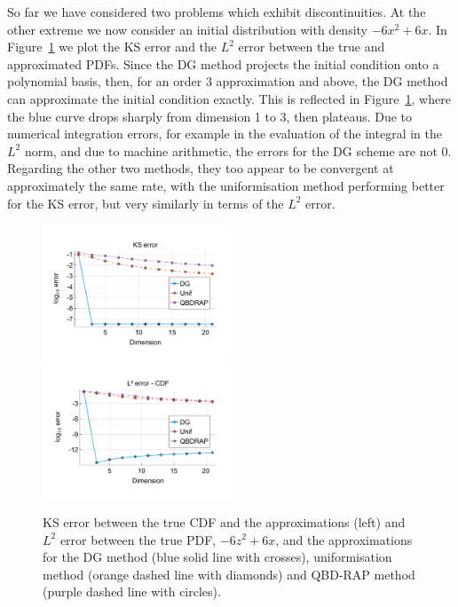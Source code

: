 \begin{example}So far we have considered two problems which exhibit discontinuities. At the other extreme we now consider an initial distribution with density \(-6x^2+6x\). In Figure~\ref{fig: fun 6 comp} we plot the KS error and the \(L^2\) error between the true and approximated PDFs. Since the DG method projects the initial condition onto a polynomial basis, then, for an order 3 approximation and above, the DG method can approximate the initial condition exactly. This is reflected in Figure~\ref{fig: fun 6 comp}, where the blue curve drops sharply from dimension 1 to 3, then plateaus. Due to numerical integration errors, for example in the evaluation of the integral in the \(L^2\) norm, and due to machine arithmetic, the errors for the DG scheme are not 0. Regarding the other two methods, they too appear to be convergent at approximately the same rate, with the uniformisation method performing better for the KS error, but very similarly in terms of the \(L^2\) error. 
\begin{figure}[h]
	\centering
	\includegraphics[width=0.5\textwidth,trim={1.25cm 0.8cm 0.25cm 1.25cm},clip]{chapter6/figs/comp/fun6/meshs_ks_error_formatted.pdf}%
	\includegraphics[width=0.5\textwidth,trim={1.25cm 0.8cm 0.25cm 1.25cm},clip]{chapter6/figs/comp/fun6/meshs_l2_pdf_error_formatted.pdf}
	\caption{KS error between the true CDF and the approximations (left) and \(L^2\) error between the true PDF, \(-6z^2+6x\), and the approximations for the DG method (blue solid line with crosses), uniformisation method (orange dashed line with diamonds) and QBD-RAP method (purple dashed line with circles).}
	\label{fig: fun 6 comp} 
\end{figure}
\exampleFloatBarrier
\end{example}

